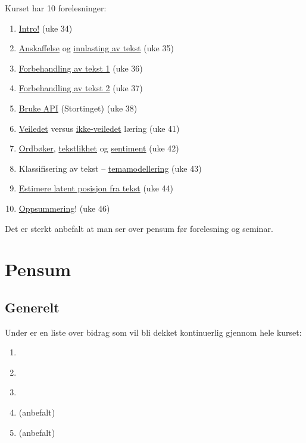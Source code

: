 \documentclass[
]{book}
\providecommand{\tightlist}{%
  \setlength{\itemsep}{0pt}\setlength{\parskip}{0pt}}
\begin{document}
Kurset har 10 forelesninger:

\begin{enumerate}
\def\labelenumi{\arabic{enumi}.}
\tightlist
\item
  \protect\hyperlink{introduksjon}{Intro!} (uke 34)
\item
  \protect\hyperlink{anskaff}{Anskaffelse} og \protect\hyperlink{lastetekst}{innlasting av tekst} (uke 35)
\item
  \protect\hyperlink{prepros}{Forbehandling av tekst 1} (uke 36)
\item
  \protect\hyperlink{prepros}{Forbehandling av tekst 2} (uke 37)
\item
  \protect\hyperlink{anskaff}{Bruke API} (Stortinget) (uke 38)
\item
  \protect\hyperlink{sup}{Veiledet} versus \protect\hyperlink{unsup}{ikke-veiledet} læring (uke 41)
\item
  \protect\hyperlink{ordboker}{Ordbøker}, \protect\hyperlink{tekststats}{tekstlikhet} og \protect\hyperlink{sentiment}{sentiment} (uke 42)
\item
  Klassifisering av tekst -- \protect\hyperlink{topicmod}{temamodellering} (uke 43)
\item
  \protect\hyperlink{posisjon}{Estimere latent posisjon fra tekst} (uke 44)
\item
  \href{oppsummering}{Oppsummering}! (uke 46)
\end{enumerate}

Det er sterkt anbefalt at man ser over pensum før forelesning og seminar.

\hypertarget{pensum}{%
\section{Pensum}\label{pensum}}

\hypertarget{generelt}{%
\subsection{Generelt}\label{generelt}}

Under er en liste over bidrag som vil bli dekket kontinuerlig gjennom hele kurset:

\begin{enumerate}
\def\labelenumi{\arabic{enumi}.}
\tightlist
\item
  \citet{Silge2017}
\item
  \citet{Grimmer2022}
\item
  \citet{Benoit2017}
\item
  \citet{Jurafsky2021b} (anbefalt)
\item
  \citet{Wickham2016} (anbefalt)
\end{enumerate}
\end{document}
